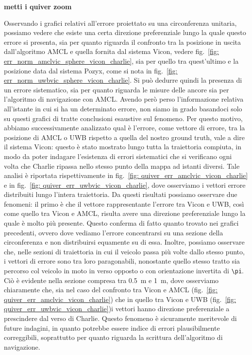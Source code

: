 \textbf{metti i quiver zoom}

Osservando i grafici relativi all'errore proiettato su una circonferenza unitaria, possiamo vedere che esiste una certa direzione 
preferenziale lungo la quale questo errore si presenta, sia per quanto riguarda il confronto tra la posizione in uscita dall'algoritmo AMCL e 
quella fornita dal sistema Vicon, vedere fig.~\ref{fig: err_norm_amclvic_sphere_vicon_charlie}, sia per quello tra quest'ultimo e la posizione data dal sistema Pozyx, come si nota in fig.~\ref{fig: err_norm_uwbvic_sphere_vicon_charlie}. 
Si può dedurre quindi la presenza di un errore sistematico, sia per quanto riguarda le misure delle ancore sia per l'algoritmo di navigazione con AMCL. Avendo però perso l'informazione relativa all'istante in cui si ha un determinato errore, non siamo in grado basandoci solo su questi grafici di tratte conclusioni esaustive sul fenomeno. Per questo motivo, abbiamo successivamente analizzato qual è l'errore, come vettore di errore, tra la posizione di AMCL o UWB rispetto a quella del nostro ground truth, vale a dire il sistema Vicon: questo è stato mostrato lungo tutta la traiettoria compiuta, in modo da poter indagare l'esistenza di errori sistematici che si verificano ogni volta che Charlie ripassa nello stesso punto della mappa ad istanti diversi. 
Tale analisi è riportata rispettivamente in fig.~\ref{fig: quiver_err_amclvic_vicon_charlie} e in fig.~\ref{fig: quiver_err_uwbvic_vicon_charlie}, dove osserviamo i vettori errore distribuiti lungo l'intera traiettoria. Da questi risultati possiamo osservare due fenomeni: il primo è che il vettore rappresentante l'errore tra Vicon e UWB, così come quello tra Vicon e AMCL, risulta avere una direzione preferenziale lungo la quale è molto più presente. Questo conferma di fatto quanto trovato nei grafici precedenti, ovvero dove vediamo l'errore concentrarsi su una sezione della circonferenza e non distribuirsi equamente su di essa. Inoltre, possiamo osservare che, nelle sezioni di traiettoria in cui il veicolo passa più volte dallo stesso punto, i vettori di errore sono tra loro paragonabili, nonostante quello stesso tratto sia percorso col veicolo in moto in verso opposto o con orientazione invertita di \verb|\pi|. Ciò è evidente nella sezione compresa tra \SI{0.5}{\metre} e \SI{1}{\metre}, dove osserviamo chiaramente che, sia nel caso del confronto tra Vicon e AMCL (fig.~\ref{fig: quiver_err_amclvic_vicon_charlie}) che in quello tra Vicon e UWB (fig.~\ref{fig: quiver_err_uwbvic_vicon_charlie})i vettori hanno direzione preferenziale a prescindere dal verso di Charlie.
Questo fenomeno è sicuramente meritevole di future indagini, in quanto potrebbe essere indice di errori plausibilmente correggibili, soprattutto per quanto riguarda la scrittura dell'algoritmo di navigazione.

